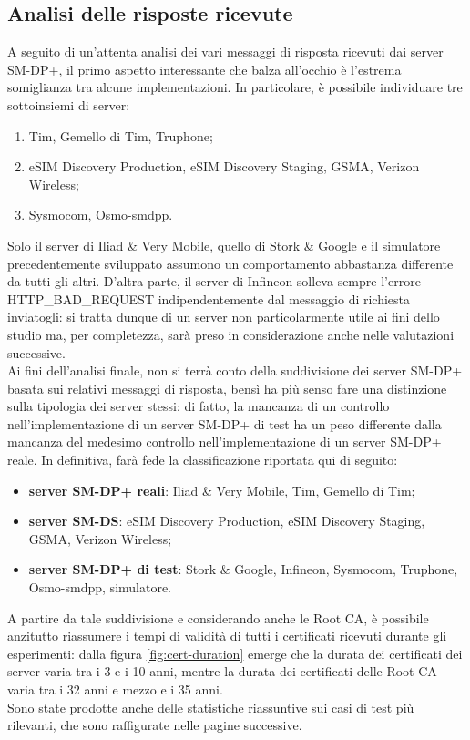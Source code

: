 \documentclass[10pt, oneside]{book}
\begin{document}
\subsection{Analisi delle risposte ricevute}
A seguito di un'attenta analisi dei vari messaggi di risposta ricevuti dai server SM-DP+, il primo aspetto interessante che balza all'occhio è l'estrema somiglianza tra alcune implementazioni. In particolare, è possibile individuare tre sottoinsiemi di server:
\begin{enumerate}
\item Tim, Gemello di Tim, Truphone;
\item eSIM Discovery Production, eSIM Discovery Staging, GSMA, Verizon Wireless;
\item Sysmocom, Osmo-smdpp.
\end{enumerate}
Solo il server di Iliad \& Very Mobile, quello di Stork \& Google e il simulatore precedentemente sviluppato assumono un comportamento abbastanza differente da tutti gli altri. D'altra parte, il server di Infineon solleva sempre l'errore HTTP\_BAD\_REQUEST indipendentemente dal messaggio di richiesta inviatogli: si tratta dunque di un server non particolarmente utile ai fini dello studio ma, per completezza, sarà preso in considerazione anche nelle valutazioni successive.\\
Ai fini dell'analisi finale, non si terrà conto della suddivisione dei server SM-DP+ basata sui relativi messaggi di risposta, bensì ha più senso fare una distinzione sulla tipologia dei server stessi: di fatto, la mancanza di un controllo nell'implementazione di un server SM-DP+ di test ha un peso differente dalla mancanza del medesimo controllo nell'implementazione di un server SM-DP+ reale. In definitiva, farà fede la classificazione riportata qui di seguito:
\begin{itemize}
\item \textbf{server SM-DP+ reali}: Iliad \& Very Mobile, Tim, Gemello di Tim;
\item \textbf{server SM-DS}: eSIM Discovery Production, eSIM Discovery Staging, GSMA, Verizon Wireless;
\item \textbf{server SM-DP+ di test}: Stork \& Google, Infineon, Sysmocom, Truphone, Osmo-smdpp, simulatore.
\end{itemize}
A partire da tale suddivisione e considerando anche le Root CA, è possibile anzitutto riassumere i tempi di validità di tutti i certificati ricevuti durante gli esperimenti: dalla figura \ref{fig:cert-duration} emerge che la durata dei certificati dei server varia tra i 3 e i 10 anni, mentre la durata dei certificati delle Root CA varia tra i 32 anni e mezzo e i 35 anni.\\
Sono state prodotte anche delle statistiche riassuntive sui casi di test più rilevanti, che sono raffigurate nelle pagine successive.
\end{document}
